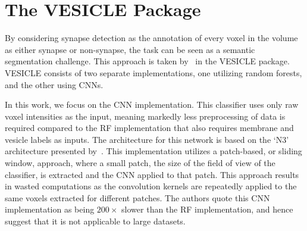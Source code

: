 \documentclass{article}
\begin{document}
 
\section*{The VESICLE Package}
\label{sec:prior}
By considering synapse detection as the annotation of every voxel in the volume as either synapse or non-synapse, the task can be seen as a semantic segmentation challenge.
This approach is taken by~\citet{roncal2014vesicle} in the VESICLE package.
VESICLE consists of two separate implementations, one utilizing random forests, and the other using CNNs.
 
In this work, we focus on the CNN implementation.
This classifier uses only raw voxel intensities as the input, meaning markedly less preprocessing of data is required compared to the RF implementation that also requires membrane and vesicle labels as inputs.
The architecture for this network is based on the `N3' architecture presented by~\citet{ciresan2012segment}.
This implementation utilizes a patch-based, or sliding window, approach, where a small patch, the size of the field of view of the classifier, is extracted and the CNN applied to that patch.
This approach results in wasted computations as the convolution kernels are repeatedly applied to the same voxels extracted for different patches.
The authors quote this CNN implementation as being $200\times$ slower than the RF implementation, and hence suggest that it is not applicable to large datasets.
\end{document}
